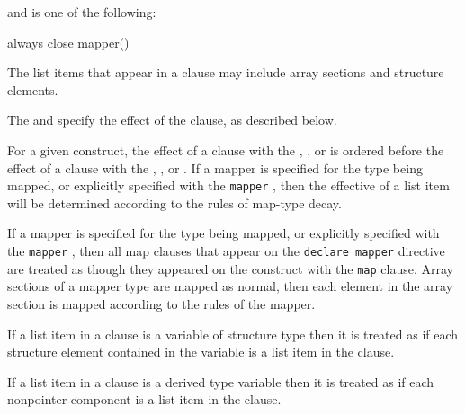and  is one of the following:

\begin{indentedcodelist}
always
close
mapper()
\end{indentedcodelist}

\descr
The list items that appear in a  clause may include array sections and structure elements.



The  and  specify the effect of the  clause, as described below.

For a given construct, the effect of a  clause with the ,
, or   is ordered before the effect of a
 clause with the , , or 
. If a mapper is specified for the type being mapped, or
explicitly specified with the \verb`mapper` , then the
effective  of a list item will be determined according to the
rules of map-type decay.

If a mapper is specified for the type being mapped, or explicitly specified with
the \verb`mapper` , then all map clauses that appear on the
\verb`declare mapper` directive are treated as though they appeared on the
construct with the \verb`map` clause.  Array sections of a mapper type are
mapped as normal, then each element in the array section is mapped according to
the rules of the mapper.

\begin{ccppspecific}
If a list item in a  clause is a variable of structure type then it
is treated as if each structure element contained in the variable is a list
item in the clause.
\end{ccppspecific}

\begin{fortranspecific}
If a list item in a  clause is a derived type variable
then it is treated as if each nonpointer component is a list item in
the clause.
\end{fortranspecific}

